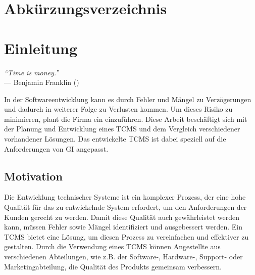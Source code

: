 \documentclass[a4paper, fontsize=11pt, parskip=half, twoside]{scrreprt}
\begin{document}
	\chapter*{Abkürzungsverzeichnis}
	\begin{acronym}
	
	\end{acronym}
	
	
	\clearpage
	\chapter{Einleitung}
	
	\begin{flushright}
		\rightskip=8cm\textit{``Time is money.''} \\
		\vspace{.2em}
		\rightskip=3cm--- Benjamin Franklin (\textcite{franklin_advice_1748})
	\end{flushright}

	In der Softwareentwicklung kann es durch Fehler und Mängel zu Verzögerungen und dadurch in weiterer Folge zu Verlusten kommen.
	Um dieses Risiko zu minimieren, plant die Firma  ein  einzuführen.
	Diese Arbeit beschäftigt sich mit der Planung und Entwicklung eines \ac{TCMS} und dem Vergleich verschiedener vorhandener Lösungen. 
	Das entwickelte \ac{TCMS} ist dabei speziell auf die Anforderungen von \ac{GI} angepasst.
	
	
	\section{Motivation} \label{sec:motivation}
	Die Entwicklung technischer Systeme ist ein komplexer Prozess, der eine hohe Qualität für das zu entwickelnde System erfordert, um den Anforderungen der Kunden gerecht zu werden. 
	Damit diese Qualität auch gewährleistet werden kann, müssen Fehler sowie Mängel identifiziert und ausgebessert werden. 
	Ein \ac{TCMS} bietet eine Lösung, um diesen Prozess zu vereinfachen und effektiver zu gestalten. 
	Durch die Verwendung eines \ac{TCMS} können Angestellte aus verschiedenen Abteilungen, wie z.B. der Software-, Hardware-, Support- oder Marketingabteilung, die Qualität des Produkts gemeinsam verbessern. 
	
\end{document}
